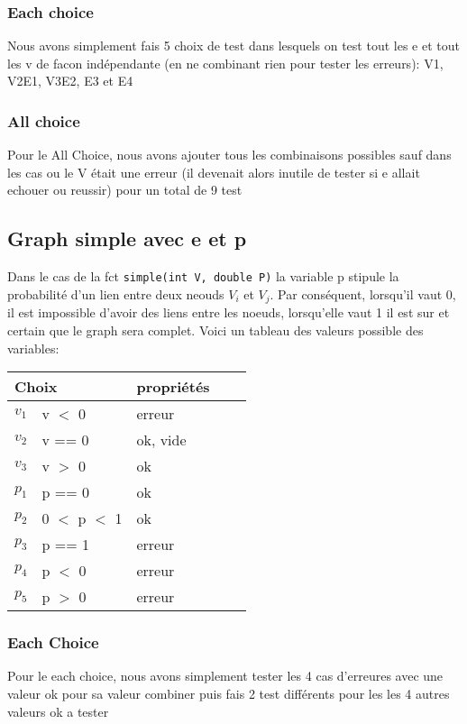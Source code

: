 \documentclass[11pt]{article}
\begin{document}
\subsubsection{Each choice}
Nous avons simplement fais 5 choix de test dans lesquels on test tout les e et tout les v de facon indépendante (en ne combinant rien pour tester les erreurs): V1, V2E1, V3E2, E3 et E4
\subsubsection{All choice}
Pour le All Choice, nous avons ajouter tous les combinaisons possibles sauf dans les cas ou le V était une erreur (il devenait alors inutile de tester si e allait echouer ou reussir) pour un total de 9 test
\subsection{Graph simple avec e et p}
Dans le cas de la fct \verb|simple(int V, double P)| la variable p stipule la probabilité d'un lien entre deux neouds $V_i$ et $V_j$.
Par conséquent, lorsqu'il vaut 0, il est impossible d'avoir des liens entre les noeuds, lorsqu'elle vaut 1 il est sur et certain que le graph sera complet.
Voici un tableau des valeurs possible des variables:
\begin{tabular}{|l|l|l|l|l|}
 \hline
 \multicolumn{2}{|l|}{Choix} & propriétés               \\ \hline
 $v_1$                       & v $<$ 0       & erreur   \\ \hline
 $v_2$                       & v == 0        & ok, vide \\ \hline
 $v_3$                       & v $>$ 0       & ok       \\ \hline \hline
 $p_1$                       & p == 0        & ok       \\ \hline
 $p_2$                       & 0 $<$ p $<$ 1 & ok       \\ \hline
 $p_3$                       & p == 1        & erreur   \\ \hline
 $p_4$                       & p $<$ 0       & erreur   \\ \hline
 $p_5$                       & p $>$ 0       & erreur   \\ \hline
\end{tabular}
\subsubsection{Each Choice}
Pour le each choice, nous avons simplement tester les 4 cas d'erreures avec une valeur ok pour sa valeur combiner puis fais 2 test différents pour les les 4 autres valeurs ok a tester
\end{document}
